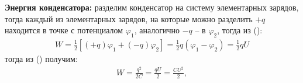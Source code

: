 \documentclass[__minimum__.tex]{subfiles}
\begin{document}
\textbf{Энергия конденсатора:} разделим конденсатор на систему элементарных зарядов, тогда каждый из элементарных зарядов, на которые можно разделить $+q$ находится в точке с потенциалом $\varphi_1$, аналогично $-q$ -- в $\varphi_2$, тогда из ():
\begin{gather}
W
=
\frac{1}{2}\left[(+q)\varphi_{1}+(-q)\varphi_{2}\right]
=
\frac{1}{2}q(\varphi_1-\varphi_2)=\frac{1}{2}qU
\end{gather}
тогда из () получим:
\begin{gather}
W=\frac{q^2}{2C}=\frac{qU}{2}=\frac{CU^2}{2},
\end{gather}
\end{document}
